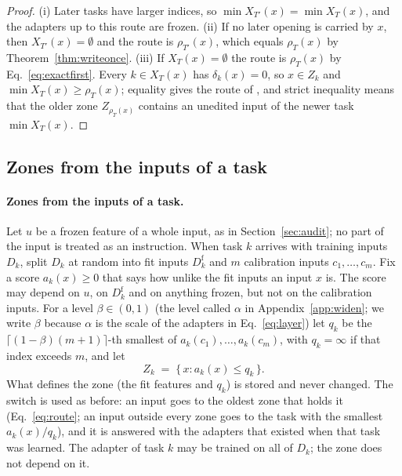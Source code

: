 \begin{proof}
(i) Later tasks have larger indices, so $\min X_{T'}(x) = \min X_T(x)$, and the adapters up to this
route are frozen. (ii) If no later opening is carried by $x$, then $X_{T'}(x) = \emptyset$ and the
route is $\rho_{T'}(x)$, which equals $\rho_T(x)$ by Theorem~\ref{thm:writeonce}. (iii) If $X_T(x)=\emptyset$ the route is $\rho_T(x)$ by Eq.~\eqref{eq:exactfirst}. Every $k\in X_T(x)$ has $\delta_k(x)=0$, so $x\in Z_k$ and $\min X_T(x)\ge\rho_T(x)$; equality gives the route of \cert{}, and strict inequality means that the older zone $Z_{\rho_T(x)}$ contains an unedited input of the newer task $\min X_T(x)$.
\end{proof}

\subsection{Zones from the inputs of a task}
\paragraph{Zones from the inputs of a task.} Let $u$ be a frozen feature of a whole input, as in
Section~\ref{sec:audit}; no part of the input is treated as an instruction. When task $k$ arrives with training inputs $D_k$, split
$D_k$ at random into fit inputs $D_k^{\mathrm{f}}$ and $m$ calibration inputs $c_1, \dots, c_m$.
Fix a score $a_k(x) \ge 0$ that says how unlike the fit inputs an input $x$ is. The score may depend
on $u$, on $D_k^{\mathrm{f}}$ and on anything frozen, but not on the calibration inputs. For a level
$\beta \in (0,1)$ (the level called $\alpha$ in Appendix~\ref{app:widen}; we write $\beta$ because $\alpha$ is the scale of the adapters in Eq.~\eqref{eq:layer}) let $q_k$ be the $\lceil (1-\beta)(m+1) \rceil$-th smallest of
$a_k(c_1), \dots, a_k(c_m)$, with $q_k = \infty$ if that index exceeds $m$, and let
\begin{equation}
  Z_k \;=\; \{\, x : a_k(x) \le q_k \,\} .
  \label{eq:inputzone}
\end{equation}
What defines the zone (the fit features and $q_k$) is stored and never changed. The switch is used
as before: an input goes to the oldest zone that holds it (Eq.~\eqref{eq:route}; an input outside every zone goes to the task with the smallest $a_k(x)/q_k$), and it is answered
with the adapters that existed when that task was learned. The adapter of task $k$ may be trained
on all of $D_k$; the zone does not depend on it.

